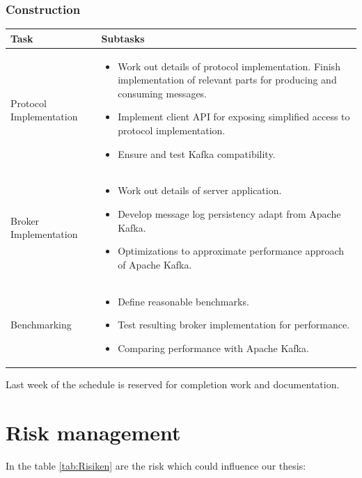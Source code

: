 \subsubsection{Construction}
\begin{tabular}[H]{|p{6cm}|p{10cm}|}\hline
   \textbf{Task} & \textbf{Subtasks} \\ \hline
    Protocol Implementation &
        \begin{itemize}
            \item Work out details of protocol implementation. Finish
                implementation of relevant parts for producing and consuming
                messages. 
            \item Implement client API for exposing simplified access to protocol
                implementation.
            \item Ensure and test Kafka compatibility.
        \end{itemize} \\ \hline
    Broker Implementation &
        \begin{itemize}
            \item Work out details of server application.
            \item Develop message log persistency adapt from Apache Kafka. 
            \item Optimizations to approximate performance approach of
            Apache Kafka. 
        \end{itemize} \\ \hline
    Benchmarking &
        \begin{itemize}
            \item Define reasonable benchmarks.
            \item Test resulting broker implementation for performance.
            \item Comparing performance with Apache Kafka.
        \end{itemize} \\ \hline
\end{tabular}

Last week of the schedule is reserved for completion work and documentation. 

\newpage
\section*{Risk management}

In the table \ref{tab:Risiken} are the risk which could influence our thesis: 

